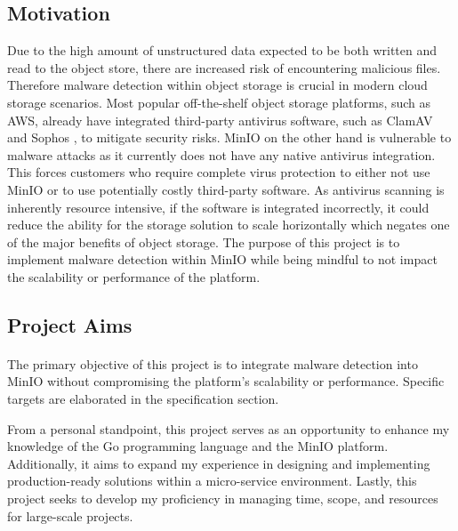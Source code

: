 \documentclass[12pt, conference, final, a4paper, onecolumn, compsoc]{IEEEtran}
\begin{document}
\subsection*{Motivation} %

Due to the high amount of unstructured data expected to be both written and read
to the object store, there are increased risk of encountering malicious files.
Therefore malware detection within object storage is crucial in modern cloud
storage scenarios. Most popular off-the-shelf object storage platforms, such as
AWS, already have integrated third-party antivirus software, such as ClamAV and
Sophos \citep{amazon-md}, to mitigate security risks. MinIO on the other hand is
vulnerable to malware attacks as it currently does not have any native antivirus
integration. This forces customers who require complete virus protection to
either not use MinIO or to use potentially costly third-party software. As
antivirus scanning is inherently resource intensive, if the software is
integrated incorrectly, it could reduce the ability for the storage solution to
scale horizontally which negates one of the major benefits of object storage.
The purpose of this project is to implement malware detection within MinIO while
being mindful to not impact the scalability or performance of the platform.

\subsection*{Project Aims} %


\paragraph{}
The primary objective of this project is to integrate malware detection into
MinIO without compromising the platform's scalability or performance. Specific
targets are elaborated in the specification section.

From a personal standpoint, this project serves as an opportunity to enhance my
knowledge of the Go programming language and the MinIO platform. Additionally,
it aims to expand my experience in designing and implementing production-ready
solutions within a micro-service environment. Lastly, this project seeks to
develop my proficiency in managing time, scope, and resources for large-scale
projects.
\end{document}
